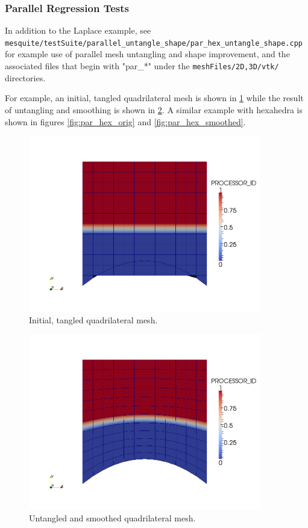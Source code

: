 \subsubsection{Parallel Regression Tests}

In addition to the Laplace example, see \\
\texttt{mesquite/testSuite/parallel\_untangle\_shape/par\_hex\_untangle\_shape.cpp} \\
for example use of parallel mesh untangling and shape improvement, and
the associated files that begin with "par\_*" under the
\texttt{meshFiles/{2D,3D}/vtk/} directories.

For example, an initial, tangled quadrilateral mesh is shown in
\ref{fig:par_quad_orig}
while the result of untangling and smoothing is shown in
\ref{fig:par_quad_smoothed}.  A similar example with hexahedra is
shown in figures
\ref{fig:par_hex_orig}  and \ref{fig:par_hex_smoothed}.

\begin{figure}[htpb]
\begin{center}
\includegraphics[width=4in]{figures/par-quad-orig}
\caption{Initial, tangled quadrilateral mesh.}
\label{fig:par_quad_orig}
\end{center}
\end{figure}

\begin{figure}[htpb]
\begin{center}
\includegraphics[width=4in]{figures/par-quad-smoothed}
\caption{Untangled and smoothed quadrilateral mesh.}
\label{fig:par_quad_smoothed}
\end{center}
\end{figure}

